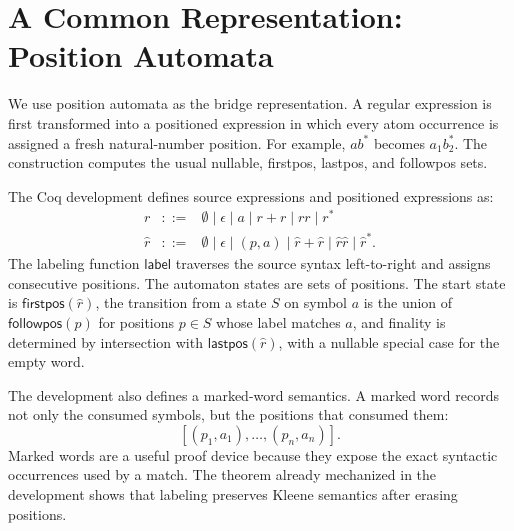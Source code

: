 \section{A Common Representation: Position Automata}

We use position automata as the bridge representation.  A regular expression is
first transformed into a positioned expression in which every atom occurrence is
assigned a fresh natural-number position.  For example, \(ab^{*}\) becomes
\(a_1 b_2^{*}\).  The construction computes the usual nullable, firstpos,
lastpos, and followpos sets.

The Coq development defines source expressions and positioned expressions as:
\[
\begin{array}{rcl}
r &::=& \emptyset \mid \epsilon \mid a \mid r+r \mid rr \mid r^{*}\\
\hat r &::=& \emptyset \mid \epsilon \mid (p,a) \mid \hat r+\hat r
        \mid \hat r\hat r \mid \hat r^{*}.
\end{array}
\]
The labeling function \(\mathsf{label}\) traverses the source syntax
left-to-right and assigns consecutive positions.  The automaton states are sets
of positions.  The start state is \(\mathsf{firstpos}(\hat r)\), the transition
from a state \(S\) on symbol \(a\) is the union of
\(\mathsf{followpos}(p)\) for positions \(p\in S\) whose label matches \(a\),
and finality is determined by intersection with \(\mathsf{lastpos}(\hat r)\),
with a nullable special case for the empty word.

The development also defines a marked-word semantics.  A marked word records not
only the consumed symbols, but the positions that consumed them:
\[
  [(p_1,a_1),\ldots,(p_n,a_n)].
\]
Marked words are a useful proof device because they expose the exact syntactic
occurrences used by a match.  The theorem already mechanized in the development
shows that labeling preserves Kleene semantics after erasing positions.
